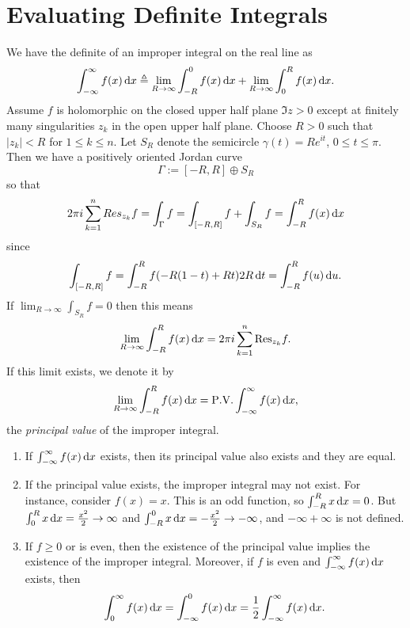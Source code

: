 \section{Evaluating Definite Integrals}

We have the definite of an improper integral on the real line as
$$
           \int_{-\infty}^\infty
             f(x)
             \mathop{}\!\mathrm{d} x
\triangleq \lim_{R \to \infty}
             \int_{-R}^0
               f(x)
               \mathop{}\!\mathrm{d} x
         + \lim_{R \to \infty}
             \int_0^R
               f(x)
               \mathop{}\!\mathrm{d} x.
$$
Assume $f$ is holomorphic on the closed upper half plane
${\Im z > 0}$ except at finitely many singularities $z_k$
in the open upper half plane. Choose $R > 0$ such that $|z_k| < R$
for $1 \leq k \leq n$. Let $S_R$ denote the semicircle
$\gamma(t) = R e^{it}$, $0 \leq t \leq \pi.$ Then we have a
positively oriented Jordan curve
$$
\Gamma := [-R, R] \oplus S_R
$$
so that
$$
  2 \pi i \sum_{k=1}^n Res_{z_k} f
= \int_{\Gamma} f
= \int_{[-R, R]} f + \int_{S_R} f
= \int_{-R}^{R}
    f(x)
    \mathop{}\!\mathrm{d} x
$$
since
$$
  \int_{[-R, R]} f
= \int_{-R}^R f(-R(1 - t) + R t) 2 R \mathop{}\!\mathrm{d} t
= \int_{-R}^R f(u) \mathop{}\!\mathrm{d} u.
$$
If $\lim_{R \to \infty} \int_{S_R} f = 0$ then this means
$$
  \lim_{R \to \infty}
  \int_{-R}^R
    f(x) \mathop{}\!\mathrm{d} x
= 2 \pi i
  \sum_{k=1}^n
    \mathrm{Res}_{z_k} f.
$$
If this limit exists, we denote it by
$$
  \lim_{R \to \infty}
  \int_{-R}^R
    f(x) \mathop{}\!\mathrm{d} x
= \mathrm{P.V.}
    \int_{-\infty}^\infty
      f(x)
      \mathop{}\!\mathrm{d} x,
$$
the \emph{principal value} of the improper integral.

\begin{enumerate}
  \item{
    If $\int_{-\infty}^\infty f(x) \mathop{}\!\mathrm{d} x$ exists, then its
    principal value also exists and they are equal.
  }
  \item{
    If the principal value exists, the improper integral may not
    exist. For instance, consider $f(x) = x$. This is an odd function,
    so $\int_{-R}^R x \mathop{}\!\mathrm{d} x = 0$. But
    $\int_0^R x \mathop{}\!\mathrm{d} x = \frac{x^2}{2} \to \infty$ and
    $\int_{-R}^0 x \mathop{}\!\mathrm{d} x = -\frac{x^2}{2} \to -\infty$, and
    $-\infty + \infty$ is not defined.
  }
  \item{
    If $f \geq 0$ or is even, then the existence of the principal
    value implies the existence of the improper integral. Moreover, if
    $f$ is even and $\int_{-\infty}^\infty f(x) \mathop{}\!\mathrm{d} x$ exists, then
    $$
      \int_0^\infty f(x) \mathop{}\!\mathrm{d} x
    = \int_{-\infty}^0 f(x) \mathop{}\!\mathrm{d} x
    = \frac{1}{2}
      \int_{-\infty}^\infty f(x) \mathop{}\!\mathrm{d} x.
    $$
  }
\end{enumerate}

